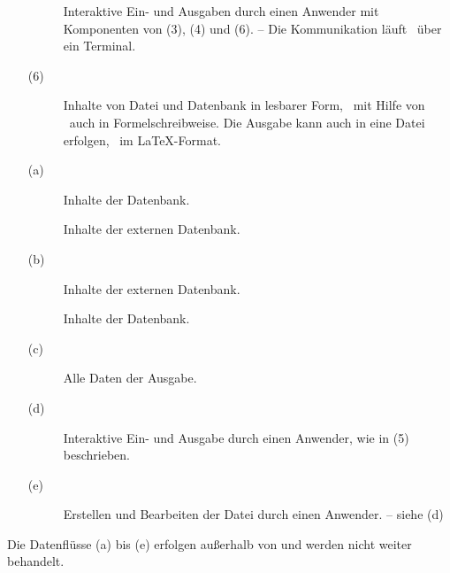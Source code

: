 \begin{itemize}
\begin{description}
		\item[]\label{dat:mitAnwender}
		Interaktive Ein- und Ausgaben durch einen Anwender mit Komponenten von (3), (4) und (6).
		-- Die Kommunikation läuft \textiAlg\ über ein Terminal.
	\end{description}
	\item[(6)]\label{dat:Ausgabe}
	\begin{description}
		\item[]\label{dat:inAusgabe}
		Inhalte von Datei und Datenbank in lesbarer Form, \textua\ mit Hilfe von \Ausgabeschemata\ auch in Formelschreibweise.
		Die Ausgabe kann auch in eine Datei erfolgen,
		\textzB\ im \LaTeX-Format.
	\end{description}
	\item[(a)]\label{dat:extInternet}
	\begin{description}
		\item[]\label{dat:ausextInternet}
		Inhalte der Datenbank.
		\item[]\label{dat:inextInternet}
		Inhalte der externen Datenbank.
	\end{description}
	\item[(b)]\label{dat:extDatenbank}
	\begin{description}
		\item[]
		\label{dat:ausextDatenbank} Inhalte der externen Datenbank.
		\item[]
		\label{dat:inextDatenbank} Inhalte der Datenbank.
	\end{description}
	\item[(c)]\label{dat:AusgabeAnwender}
	\begin{description}
		\item[]\label{dat:Ausgabe2Anwender}
		Alle Daten der Ausgabe.
	\end{description}
	\item[(d)] \label{dat:AnwenderTerminal}
	\begin{description}
		\item[]\label{dat:Anwender22Terminal}
		Interaktive Ein- und Ausgabe durch einen Anwender, wie in (5) beschrieben.
	\end{description}
	\item[(e)] \label{dat:TerminalDatei}
	\begin{description}
		\item[]\label{dat:Terminal22Datei}
		Erstellen und Bearbeiten der Datei durch einen Anwender.
		-- siehe (d)
	\end{description}
\end{itemize}
Die Datenflüsse (a) bis (e) erfolgen außerhalb von \ASBA
und werden nicht weiter behandelt.

